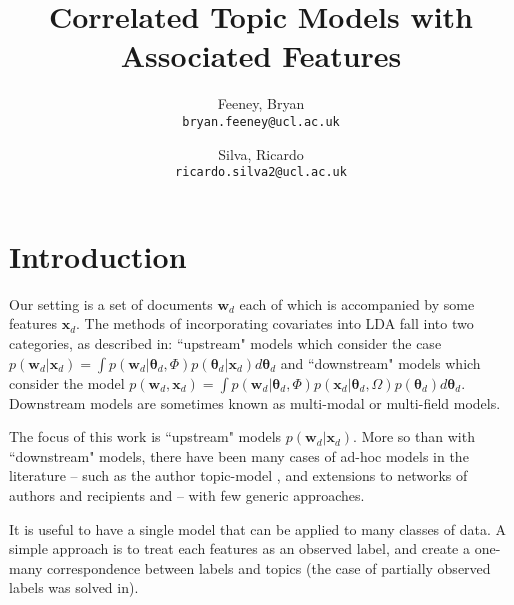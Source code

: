 \documentclass[10pt,fleqn]{article}
\author{
  Feeney, Bryan\\
  \texttt{bryan.feeney@ucl.ac.uk}
  \and
  Silva, Ricardo\\
  \texttt{ricardo.silva2@ucl.ac.uk}
}
\title{Correlated Topic Models with Associated Features}
\newcommand \vv[1] { \bm #1 }
\newcommand \wdoc      { { \vv{w}_d } }
\newcommand \thd[0]  { { \vv \theta_d } }
\newcommand \xd      { { \vv x_d } }
\begin{document}
\maketitle




\newcommand \mnord[4]  { \mathcal{N}_{{#1}} \left(#2, #3, #4\right) }




\section{Introduction}
Our setting is a set of documents $\vv{w}_d$ each of which is accompanied by some features $\vv{x}_d$. The methods of incorporating covariates into LDA fall into two categories, as described in\cite{Mimno2008}: ``upstream" models which consider the case $p(\wdoc | \xd) = \int p(\wdoc|\thd, \Phi)p(\thd|\xd) d\thd$ 
and ``downstream" models which consider the model $p(\wdoc, \xd) = \int p(\wdoc|\thd, \Phi)p(\xd|\thd, \Omega)p(\thd)d\thd$. Downstream models are sometimes known as multi-modal\cite{Virtanen2012a} or multi-field\cite{Salomatin2009} models.

The focus of this work is ``upstream" models $p(\wdoc | \xd)$. More so than with ``downstream" models, there have been many cases of ad-hoc models in the literature -- such as the author topic-model \cite{RosenZvi2004}, and extensions to networks of authors and recipients\cite{MacCallum2007}\cite{Sachan2012} and \cite{Kang2013} -- with few generic approaches.

It is useful to have a single model that can be applied to many classes of data. A simple approach is to treat each features as an observed label, and create a one-many correspondence between labels and topics\cite{Ramage2009} (the case of partially observed labels was solved in\cite{Rubin2011}).
\end{document}
